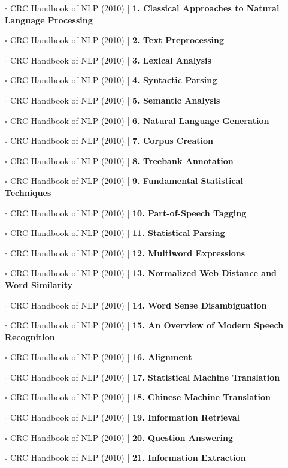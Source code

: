 \documentclass[a4, landscape, 12pt]{article}
\newcommand{\checkbox}{$\square$}%
\begin{document}
\begin{itemize}
{}
\item [\checkbox]  CRC Handbook of NLP (2010) | \textbf{ 1. Classical Approaches to Natural Language Processing
}
\item [\checkbox]  CRC Handbook of NLP (2010) | \textbf{ 2. Text Preprocessing
}
\item [\checkbox]  CRC Handbook of NLP (2010) | \textbf{ 3. Lexical Analysis
}
\item [\checkbox]  CRC Handbook of NLP (2010) | \textbf{ 4. Syntactic Parsing
}
\item [\checkbox]  CRC Handbook of NLP (2010) | \textbf{ 5. Semantic Analysis
}
\item [\checkbox]  CRC Handbook of NLP (2010) | \textbf{ 6. Natural Language Generation
}
\item [\checkbox]  CRC Handbook of NLP (2010) | \textbf{ 7. Corpus Creation
}
\item [\checkbox]  CRC Handbook of NLP (2010) | \textbf{ 8. Treebank Annotation
}
\item [\checkbox]  CRC Handbook of NLP (2010) | \textbf{ 9. Fundamental Statistical Techniques
}
\item [\checkbox]  CRC Handbook of NLP (2010) | \textbf{ 10. Part-of-Speech Tagging
}
\item [\checkbox]  CRC Handbook of NLP (2010) | \textbf{ 11. Statistical Parsing
}
\item [\checkbox]  CRC Handbook of NLP (2010) | \textbf{ 12. Multiword Expressions
}
\item [\checkbox]  CRC Handbook of NLP (2010) | \textbf{ 13. Normalized Web Distance and Word Similarity
}
\item [\checkbox]  CRC Handbook of NLP (2010) | \textbf{ 14. Word Sense Disambiguation
}
\item [\checkbox]  CRC Handbook of NLP (2010) | \textbf{ 15. An Overview of Modern Speech Recognition
}
\item [\checkbox]  CRC Handbook of NLP (2010) | \textbf{ 16. Alignment
}
\item [\checkbox]  CRC Handbook of NLP (2010) | \textbf{ 17. Statistical Machine Translation
}
\item [\checkbox]  CRC Handbook of NLP (2010) | \textbf{ 18. Chinese Machine Translation
}
\item [\checkbox]  CRC Handbook of NLP (2010) | \textbf{ 19. Information Retrieval
}
\item [\checkbox]  CRC Handbook of NLP (2010) | \textbf{ 20. Question Answering
}
\item [\checkbox]  CRC Handbook of NLP (2010) | \textbf{ 21. Information Extraction
}
\end{itemize}
\end{document}
